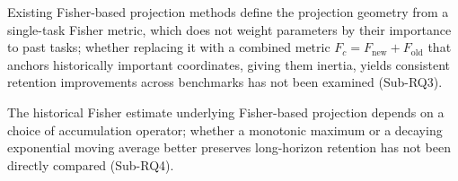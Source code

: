 Existing Fisher-based projection methods define the projection geometry from a
single-task Fisher metric, which does not weight parameters by their importance
to past tasks; whether replacing it with a combined metric
$F_c = F_{\mathrm{new}} + F_{\mathrm{old}}$ that anchors historically important
coordinates, giving them inertia, yields consistent retention improvements
across benchmarks has not been examined (Sub-RQ3).

The historical Fisher estimate underlying Fisher-based projection
depends on a choice of accumulation operator; whether a monotonic
maximum or a decaying exponential moving average better preserves
long-horizon retention has not been directly compared (Sub-RQ4).